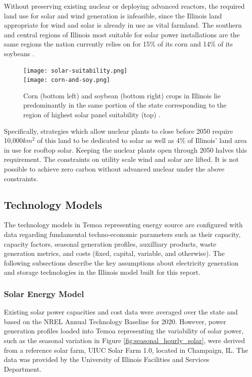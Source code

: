 Without preserving existing nuclear or deploying advanced reactors, the
required land use for solar and wind generation is infeasible, since the 
Illinois land appropriate for wind and solar is already in use as vital 
farmland. The southern and central regions of Illinois most suitable for solar 
power installations are the same regions the nation currently relies on for 
15\% of its corn and 14\% of its soybeans \cite{schleusener_illinois_2020}.  

\begin{figure}[htbp!]
        \begin{center}
                \texttt{[image: solar-suitability.png]}\\
                \vspace{0.5cm}
                \texttt{[image: corn-and-soy.png]}
        \end{center}
        \caption{Corn (bottom left) and soybean (bottom right) crops in Illinois lie predominantly in the 
        same portion of the state corresponding to the 
        region of highest solar panel suitability (top) 
        \cite{schleusener_illinois_2020,eispc_energy_2021,sengupta_national_2018}.}
        \label{fig:corn-and-soy}
\end{figure}


Specifically, strategies which allow nuclear plants to close before 2050 require 10,000$km^2$ of this land to be dedicated to solar as well as 4\% of Illinois' land area in use for rooftop solar. Keeping the nuclear plants open through 2050 halves this requirement.  
The constraints on utility scale wind and solar are lifted. It is not possible to achieve zero carbon without advanced nuclear under the above constraints.

\FloatBarrier
\subsection{Technology Models}
The technology models in Temoa representing energy source are configured with 
data regarding fundamental techno-economic parameters such as their capacity, 
capacity factors, seasonal generation profiles, auxilliary products, waste 
generation metrics, and costs (fixed, capital, variable, and otherwise). 
The following subsections describe the key assumptions about electricity 
generation and storage technologies in the Illinois model built for this 
report.

\subsubsection{Solar Energy Model}
Existing solar power capacities and cost data were averaged over the state and 
based on the \gls{NREL} Annual Technology Baseline for 2020. However, power 
generation profiles loaded into Temoa representing the variability of solar 
power, such as the seasonal variation in Figure 
\ref{fig:seasonal_hourly_solar}, were derived from a reference solar farm, UIUC Solar Farm 1.0, located in Champaign, IL. The data was provided by the University of Illinois Facilities and Services Department.
\FloatBarrier

